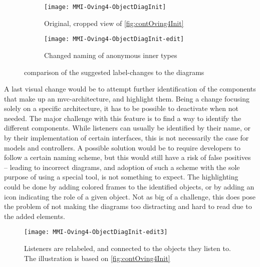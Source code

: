 \begin{figure}[H]
	\centering
	\begin{subfigure}{\textwidth}
		\centering
		\texttt{[image: MMI-Oving4-ObjectDiagInit]}
		\caption{Original, cropped view of \autoref{fig:contOving4Init}}
		\label{fig:contOving4ChangesLabA}
	\end{subfigure}
	\begin{subfigure}{\textwidth}
		\centering
		\texttt{[image: MMI-Oving4-ObjectDiagInit-edit]}
		\caption{Changed naming of anonymous inner types}
		\label{fig:contOving4ChangesLabB}
	\end{subfigure}
	\caption{comparison of the suggested label-changes to the diagrams}
	\label{fig:contOving4ChangesLab}
\end{figure}

A last visual change would be to attempt further identification of the components that make up an \gls{mvc}-architecture, and highlight them.
Being a change focusing solely on a specific architecture, it has to be possible to deactivate when not needed.
The major challenge with this feature is to find a way to identify the different components.
While listeners can usually be identified by their name, or by their implementation of certain interfaces, this is not necessarily the case for models and controllers.
A possible solution would be to require developers to follow a certain naming scheme, but this would still have a risk of false positives -- leading to incorrect diagrams, and adoption of such a scheme with the sole purpose of using a special tool, is not something to expect.
The highlighting could be done by adding colored frames to the identified objects, or by adding an icon indicating the role of a given object.
Not as big of a challenge, this does pose the problem of not making the diagrams too distracting and hard to read due to the added elements.


\begin{figure}[H]
	\centering
	\texttt{[image: MMI-Oving4-ObjectDiagInit-edit3]}
	\caption{Listeners are relabeled, and connected to the objects they listen to. The illustration is based on \autoref{fig:contOving4Init}}
	\label{fig:contOving4ChangesLink}
\end{figure}


